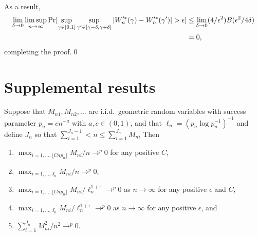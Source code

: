 \documentclass[11pt]{article}
\begin{document}
As a result,
\begin{align*}
  \lim_{\delta \to 0} \limsup_{n\to\infty} \operatorname{Pr}[\sup_{\gamma \in [0,1]}
  \sup_{\gamma' \in [\gamma - \delta, \gamma + \delta]}
  | W_n^{\prime *}(\gamma) - W_n^{\prime *}(\gamma') | > \epsilon] & \leq
  \lim_{\delta \to 0} (4/\epsilon^2)
  B(\epsilon^2/4\delta) \\
  &= 0,
\end{align*}
completing the proof.\qed

\section{Supplemental results}

\begin{lem}\label{block-length-convergence-lemma}
  Suppose that $M_{n1}, M_{n2},\dots$ are i.i.d.\ geometric random
  variables with success parameter $p_n = c n^{-a}$ with $a, c \in
  (0,1)$, and that $\ell_n = (p_n \log p_n^{-1})^{-1}$ and define
  $J_n$ so that $\sum_{i=1}^{J_n-1} < n \leq \sum_{i=1}^{J_n} M_{ni} $
  Then
  \begin{enumerate}
  \item $\max_{i=1,\dots,\lfloor C n p_n \rfloor} M_{ni} / n \to^p 0$
    for any positive $C$,
  \item $\max_{i=1,\dots,J_n} M_{ni} / n \to^p 0$,
  \item $\max_{i=1,\dots,  \lfloor C n p_n \rfloor} M_{ni} /
  \ell_n^{1+\epsilon} \to^p 0$ as $n \to \infty$ for any positive
  $\epsilon$ and $C$,
  \item $\max_{i=1,\dots,J_n} M_{ni} /
  \ell_n^{1+\epsilon} \to^p 0$ as $n \to \infty$ for any positive
  $\epsilon$, and
  \item $\sum_{i=1}^{J_n} M_{ni}^2 / n^2 \to^p 0$.
  \end{enumerate}
\end{lem}
\end{document}
